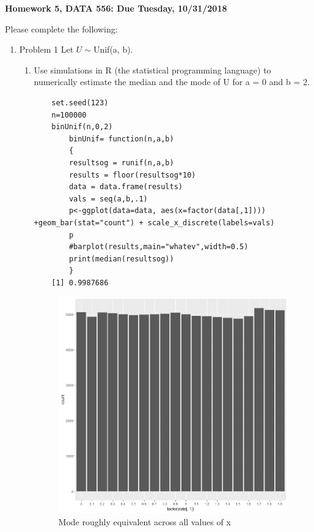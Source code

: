 \documentclass[11pt]{article}
\begin{document}
\begin{title}
	{\Large\bf Homework 5, DATA 556: Due Tuesday, 10/31/2018}
\end{title}

\author{\bf Alexander Van Roijen}

\maketitle

\newpage
Please complete the following:
\begin{enumerate}
\item Problem 1
Let $U \sim $Unif(a, b).
\begin{enumerate}
	\item Use simulations in R (the statistical programming language) to numerically estimate the median and
	the mode of U for a = 0 and b = 2.
	\begin{verbatim}
	set.seed(123)
	n=100000
	binUnif(n,0,2)
		binUnif= function(n,a,b)
		{
		resultsog = runif(n,a,b)
		results = floor(resultsog*10)
		data = data.frame(results)
		vals = seq(a,b,.1)
		p<-ggplot(data=data, aes(x=factor(data[,1]))) +geom_bar(stat="count") + scale_x_discrete(labels=vals)
		p
		#barplot(results,main="whatev",width=0.5)
		print(median(resultsog))
		}
	[1] 0.9987686
	\end{verbatim}
	\begin{figure}[H]
		\centering
		\caption{Mode roughly equivalent across all values of x}
		\includegraphics[scale=.6]{Rplot.png}

\end{figure}
\end{enumerate}
\end{enumerate}
\end{document}
